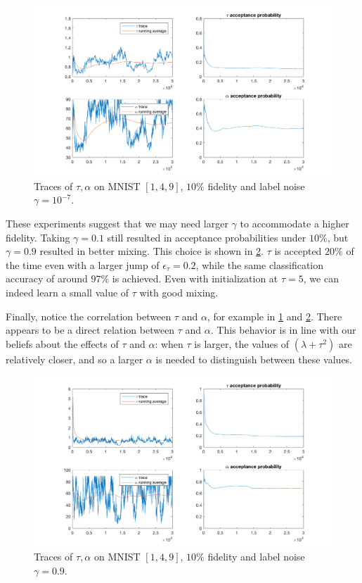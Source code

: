 \documentclass{siamart1116}
\begin{document}
        \begin{figure}[!htb]
        \centering
        \caption{\label{ta_mnist_3}Traces of $\tau, \alpha$ on MNIST $[1, 4, 9]$, $10\%$ fidelity and label noise $\gamma = 10^{-7}$.}
        \includegraphics[width=0.8\linewidth]{choose_hyp/t_a/ten_fidelity.png}
        \end{figure}

        These experiments suggest that we may need larger $\gamma$ to accommodate a higher fidelity. Taking $\gamma = 0.1$ still resulted in acceptance probabilities under $10\%$, but $\gamma = 0.9$ resulted in better mixing. This choice is shown in \cref{ta_mnist_4}. $\tau$ is accepted $20\%$ of the time even with a larger jump of $\epsilon_\tau = 0.2$, while the same classification accuracy of around $97\%$ is achieved. Even with initialization at $\tau=5$, we can indeed learn a small value of $\tau$ with good mixing. 

        Finally, notice the correlation between $\tau$ and $\alpha$, for example in \cref{ta_mnist_3} and \cref{ta_mnist_4}. There appears to be a direct relation between $\tau$ and $\alpha$. This behavior is in line with our beliefs about the effects of $\tau$ and $\alpha$: when $\tau$ is larger, the values of $(\lambda + \tau^2)$ are relatively closer, and so a larger $\alpha$ is needed to distinguish between these values.

        \begin{figure}[!htb]
        \centering
        \caption{\label{ta_mnist_4}Traces of $\tau, \alpha$ on MNIST $[1, 4, 9]$, $10\%$ fidelity and label noise $\gamma = 0.9$.}
        \includegraphics[width=0.8\linewidth]{choose_hyp/t_a/good_tau.png}
        \end{figure}
\end{document}
